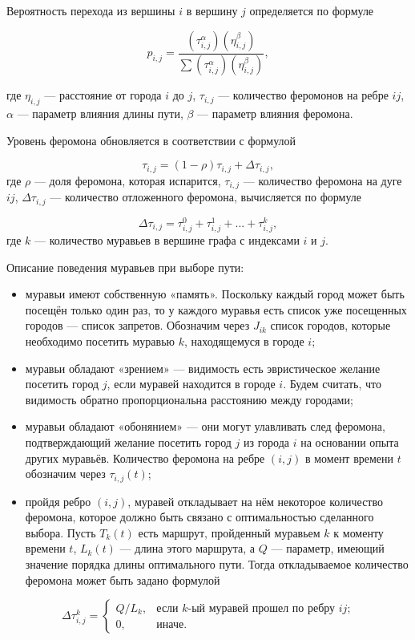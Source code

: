 Вероятность перехода из вершины $i$ в вершину $j$ определяется по формуле

$$	p_{i,j}={\frac {(\tau_{i,j}^{\alpha })(\eta_{i,j}^{\beta })}{\sum (\tau_{i,j}^{\alpha })(\eta_{i,j}^{\beta })}},$$

где $\eta_{i,j}$ --- расстояние от города $i$ до $j$, $\tau_{i,j}$ --- количество феромонов на ребре $ij$, $\alpha$ --- параметр влияния длины пути, $\beta$ --- параметр влияния феромона.

Уровень феромона обновляется в соответствии с формулой

$$	\tau_{i,j}=(1-\rho )\tau_{i,j}+\Delta \tau_{i,j},$$
где $\rho$ --- доля феромона, которая испарится, $\tau_{i,j}$ --- количество феромона на дуге $ij$, $\Delta \tau_{i,j}$ --- количество отложенного феромона, вычисляется по формуле

$$	\Delta \tau_{i,j}= \tau_{i,j}^0 + \tau_{i,j}^1 + ... + \tau_{i,j}^k,$$
где $k$ --- количество муравьев в вершине графа с индексами $i$ и $j$.

Описание поведения муравьев при выборе пути:
\begin{itemize}
\item муравьи имеют собственную «память».
	Поскольку каждый город может быть посещён только один раз, то у каждого муравья есть список уже посещенных городов --- список запретов.
	Обозначим через $J_{ik}$ список городов, которые необходимо посетить муравью $k$, находящемуся в городе $i$;
\item муравьи обладают «зрением» --- видимость есть эвристическое желание посетить город $j$, если муравей находится в городе $i$.
	Будем считать, что видимость обратно пропорциональна расстоянию между городами;
\item муравьи обладают «обонянием» --- они могут улавливать след феромона, подтверждающий желание посетить город $j$ из города $i$ на основании опыта других муравьёв.
	Количество феромона на ребре $(i,j)$ в момент времени $t$ обозначим через  $\tau_{i,j} (t)$;
\item пройдя ребро $(i,j)$, муравей откладывает на нём некоторое количество феромона, которое должно быть связано с оптимальностью сделанного выбора.
	Пусть $T _{k} (t)$ есть маршрут, пройденный муравьем $k$ к моменту времени $t$, $L _{k} (t)$ --- длина этого маршрута, а $Q$ --- параметр,
	имеющий значение порядка длины оптимального пути. Тогда откладываемое количество феромона может быть задано формулой
\end{itemize}

$$	{\displaystyle \Delta \tau_{i,j}^k={\begin{cases}Q/L_{k}, & {\mbox{если $k$-ый муравей прошел по ребру $ij$;}}\\0,&{\mbox{иначе.}}\end{cases}}}$$


